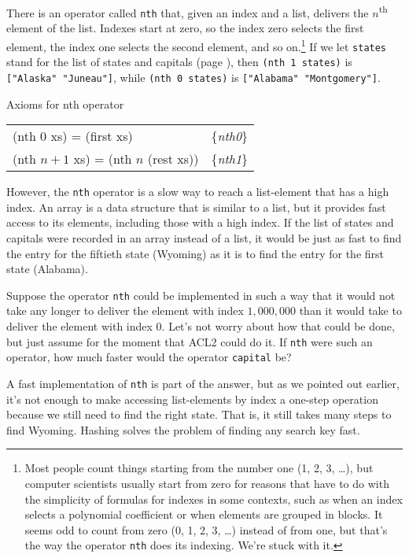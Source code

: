 There is an operator called \texttt{nth} that,
given an index and a list, delivers the
$n$\textsuperscript{th} element of the list.
Indexes start at zero, so the index
zero selects the first element,
the index one selects the second element,
and so on.\footnote{Most people
count things starting from the number one (1, 2, 3, \dots), but
computer scientists usually start from zero for reasons that
have to do with the simplicity of formulas for indexes
in some contexts, such
as when an index selects a polynomial coefficient
or when elements are grouped in blocks.
It seems odd to count from
zero (0, 1, 2, 3, \dots) instead of from one,
but that's the way the operator
\texttt{nth} does its indexing. We're stuck with it.}
If we let \texttt{states} stand for the list of states and capitals
(page \pageref{states-capitals-list}), then
\texttt{(nth 1 states)} is \texttt{["Alaska" "Juneau"]},
while \texttt{(nth 0 states)} is \texttt{["Alabama" "Montgomery"]}.

\begin{center}
Axioms for nth operator
\begin{tabular}{ll}
(nth 0 xs) = (first xs)  & \{\emph{nth0}\}     \\
(nth $n+1$ xs) = (nth $n$ (rest xs)) & \{\emph{nth1}\} \\
\end{tabular}
\end{center}

However, the \texttt{nth} operator is a slow way to reach a
list-element that has a high index.
An array is a data structure that is
similar to a list, but it provides fast access to its
elements, including those with a high index.
If the list of states and capitals were recorded in an array instead
of a list, it would be just as fast to find the entry for the
fiftieth state (Wyoming) as it is to find the entry
for the first state (Alabama).

Suppose the operator \texttt{nth} could be implemented
in such a way that it would not take any longer to
deliver the element with index $1,000,000$ than it would take
to deliver the element with index $0$.
Let's not worry about how that could be done, but
just assume for the moment that ACL2 could do it.
If \texttt{nth} were such an operator,
how much faster would the operator \texttt{capital} be?

A fast implementation of \texttt{nth} is part of
the answer, but as we pointed out earlier,
it's not enough to make accessing list-elements
by index a one-step operation
because we still need to find the right state.
That is, it still takes many steps to find Wyoming.
Hashing solves the problem of finding any search key fast.

